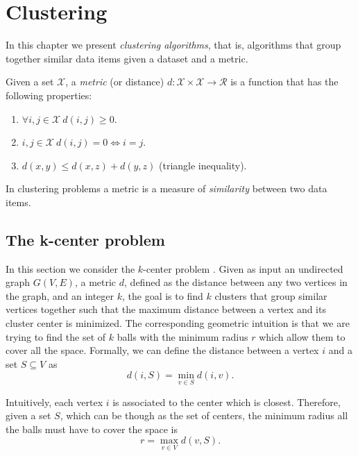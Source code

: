 \chapter{Clustering}

In this chapter we present \emph{clustering algorithms}, that is, algorithms that group together similar data items given a dataset and a metric.

\begin{defn}[Metric]
	Given a set $\mathcal{X}$, a \emph{metric} (or distance) $d:\mathcal{X} \times \mathcal{X} \rightarrow \mathcal{R}$ is a function that has the following properties:
	\begin{enumerate}
		\item $\forall i, j \in \mathcal{X}\ d(i, j) \geq 0$.
		\item $i, j \in \mathcal{X}\ d(i, j) = 0 \Longleftrightarrow i = j$.
		\item $d(x, y) \leq d(x, z) + d(y, z)$ (triangle inequality).
	\end{enumerate} 
\end{defn}

In clustering problems a metric is a measure of \emph{similarity} between two data items.

\section{The k-center problem}

In this section we consider the $k$-center problem \cite{desappralgo}. Given as input an undirected graph $G(V, E)$, a metric $d$, defined as the distance between any two vertices in the graph, and an integer $k$, the goal is to find $k$ clusters that group similar vertices together such that the maximum distance between a vertex and its cluster center is minimized. The corresponding geometric intuition is that we are trying to find the set of $k$ balls with the minimum radius $r$ which allow them to cover all the space. Formally, we can define the distance between a vertex $i$ and a set $S \subseteq V$ as
\begin{equation}
	d(i, S) = \min_{v \in S} d(i, v).
\end{equation}

Intuitively, each vertex $i$ is associated to the center which is closest. Therefore, given a set $S$, which can be though as the set of centers, the minimum radius all the balls must have to cover the space is
\begin{equation}
	r = \max_{v \in V} d(v, S).
\end{equation}

